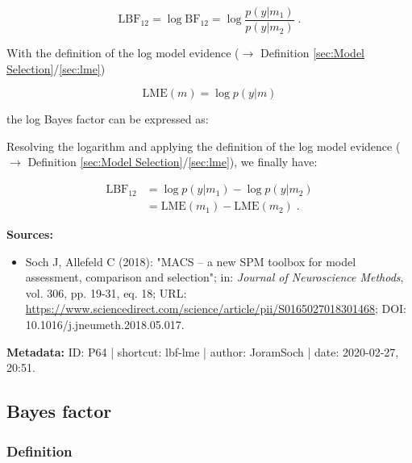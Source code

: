 \documentclass[a4paper,12pt,twoside]{book}
\begin{document}
\begin{equation} \label{eq:lbf-lme-LBF}
\mathrm{LBF}_{12} = \log \mathrm{BF}_{12} = \log \frac{p(y|m_1)}{p(y|m_2)} \; .
\end{equation}

With the definition of the log model evidence ($\rightarrow$ Definition \ref{sec:Model Selection}/\ref{sec:lme})

\begin{equation} \label{eq:lbf-lme-LME}
\mathrm{LME}(m) = \log p(y|m)
\end{equation}

the log Bayes factor can be expressed as:

Resolving the logarithm and applying the definition of the log model evidence ($\rightarrow$ Definition \ref{sec:Model Selection}/\ref{sec:lme}), we finally have:

\begin{equation} \label{eq:lbf-lme-LBF-LME-qed}
\begin{split}
\mathrm{LBF}_{12} &= \log p(y|m_1) - \log p(y|m_2) \\
&= \mathrm{LME}(m_1) - \mathrm{LME}(m_2) \; .
\end{split}
\end{equation}


\vspace{1em}
\textbf{Sources:}
\begin{itemize}
\item Soch J, Allefeld C (2018): "MACS – a new SPM toolbox for model assessment, comparison and selection"; in: \textit{Journal of Neuroscience Methods}, vol. 306, pp. 19-31, eq. 18; URL: \url{https://www.sciencedirect.com/science/article/pii/S0165027018301468}; DOI: 10.1016/j.jneumeth.2018.05.017.
\end{itemize}


\vspace{1em}
\textbf{Metadata:} ID: P64 | shortcut: lbf-lme | author: JoramSoch | date: 2020-02-27, 20:51.
\vspace{1em}



\subsection{Bayes factor}

\subsubsection[\textit{Definition}]{Definition} \label{sec:bf}
\setcounter{equation}{0}
\end{document}
